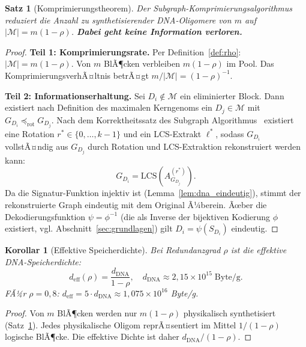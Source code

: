 ﻿\documentclass[a4paper,12pt]{article}
\theoremstyle{definition}
\theoremstyle{plain}
\newtheorem{satz}{Satz}[section]
\newtheorem{korollar}{Korollar}[section]
\begin{document}
\begin{satz}[Komprimierungstheorem]
\label{satz:komprimierung}
  Der Subgraph-Komprimierungsalgorithmus reduziert die Anzahl zu
  synthetisierender DNA-Oligomere von $m$ auf
  $|\mathcal{M}| = m(1-\rho)$.
  \textbf{Dabei geht keine Information verloren.}
\end{satz}

\begin{proof}
  \textbf{Teil 1: Komprimierungsrate.}
  Per Definition~\ref{def:rho}: $|\mathcal{M}| = m(1-\rho)$.  Von $m$
  BlÃ¶cken verbleiben $m(1-\rho)$ im Pool.  Das KomprimierungsverhÃ¤ltnis
  betrÃ¤gt $m / |\mathcal{M}| = (1-\rho)^{-1}$.

  \textbf{Teil 2: Informationserhaltung.}
  Sei $D_i \notin \mathcal{M}$ ein eliminierter Block.
  Dann existiert nach Definition des maximalen Kerngenoms ein
  $D_j \in \mathcal{M}$ mit $G_{D_i} \preceq_{\mathrm{rot}} G_{D_j}$.
  Nach dem Korrektheitssatz des Subgraph Algorithmus~\cite{dusgraph}
  existiert eine Rotation $r^* \in \{0, \ldots, k-1\}$ und ein
  LCS-Extrakt $\ell^*$, sodass $G_{D_i}$ vollstÃ¤ndig aus $G_{D_j}$ durch
  Rotation und LCS-Extraktion rekonstruiert werden kann:
  \[
    G_{D_i} = \mathrm{LCS}\!\left(A_{G_{D_j}}^{(r^*)}\right).
  \]
  Da die Signatur-Funktion injektiv ist (Lemma~\ref{lem:dna_eindeutig}),
  stimmt der rekonstruierte Graph eindeutig mit dem Original Ã¼berein.
  Ãœber die Dekodierungsfunktion $\psi = \phi^{-1}$ (die als Inverse der
  bijektiven Kodierung $\phi$ existiert, vgl. Abschnitt~\ref{sec:grundlagen})
  gilt $D_i = \psi(S_{D_i})$ eindeutig. 
\end{proof}

\begin{korollar}[Effektive Speicherdichte]
\label{kor:dichte}
  Bei Redundanzgrad $\rho$ ist die effektive DNA-Speicherdichte:
  \[
    d_{\mathrm{eff}}(\rho) = \frac{d_{\mathrm{DNA}}}{1-\rho},
    \quad d_{\mathrm{DNA}} \approx 2{,}15 \times 10^{15}\;\text{Byte/g}.
  \]
  FÃ¼r $\rho = 0{,}8$: $d_{\mathrm{eff}} = 5 \cdot d_{\mathrm{DNA}}
  \approx 1{,}075 \times 10^{16}$ Byte/g.
\end{korollar}

\begin{proof}
  Von $m$ BlÃ¶cken werden nur $m(1-\rho)$ physikalisch synthetisiert
  (Satz~\ref{satz:komprimierung}).  Jedes physikalische Oligom reprÃ¤sentiert
  im Mittel $1/(1-\rho)$ logische BlÃ¶cke.  Die effektive Dichte ist daher
  $d_{\mathrm{DNA}} / (1-\rho)$. 
\end{proof}
\end{document}
